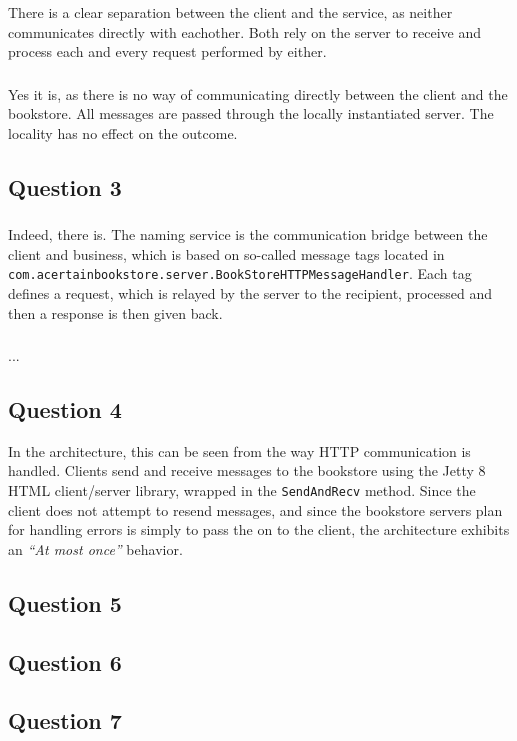 \subsubsection{}
There is a clear separation between the client and the service, as neither
communicates directly with eachother. Both rely on the server to receive and
process each and every request performed by either.

\subsubsection{}
Yes it is, as there is no way of communicating directly between the client and
the bookstore. All messages are passed through the locally instantiated server.
The locality has no effect on the outcome.

\subsection{Question 3}

\subsubsection{}
Indeed, there is. The naming service is the communication bridge between the
client and business, which is based on so-called message tags located in \\
{\tt com.acertainbookstore.server.BookStoreHTTPMessageHandler}. Each tag defines
a request, which is relayed by the server to the recipient, processed and then
a response is then given back.

\subsubsection{}
...

\subsection{Question 4}
In the architecture, this can be seen from the way HTTP communication is handled. Clients send and receive messages to the bookstore using the Jetty 8 HTML client/server library, wrapped in the {\tt SendAndRecv} method. Since the client does not attempt to resend messages, and since the bookstore servers plan for handling errors is simply to pass the on to the client, the architecture exhibits an {\it ``At most once''} behavior.

\subsection{Question 5}

\subsection{Question 6}

\subsection{Question 7}


